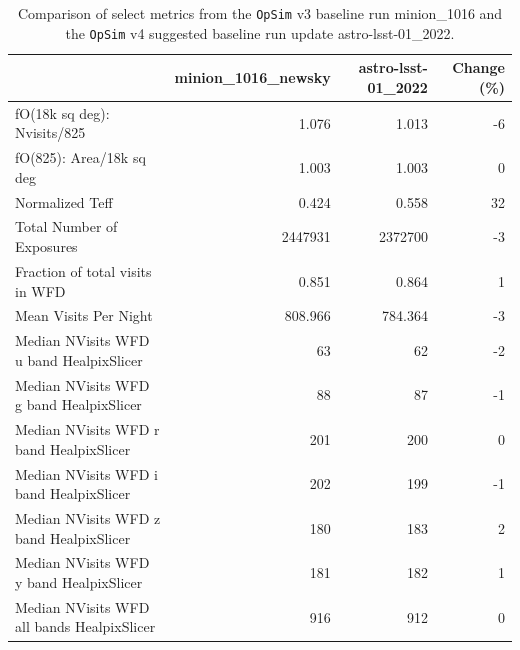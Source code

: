 \documentclass[DM,lsstdraft,authoryear,toc]{lsstdoc}
\newcommand{\opsim}{\texttt{OpSim}\xspace}
\begin{document}

\begin{table}
\caption{Comparison of select metrics from the \opsim v3 baseline run minion\_1016 and the \opsim v4 suggested baseline run update astro-lsst-01\_2022.}
\small
\begin{center}
\begin{tabular}{lrrr}
\toprule
{} &  minion\_1016\_newsky &  astro-lsst-01\_2022 &  Change (\%) \\
\midrule
fO(18k sq deg): Nvisits/825   &               1.076 &               1.013 &         -6 \\
fO(825): Area/18k sq deg     &               1.003 &               1.003 &          0 \\
Normalized Teff                                    &               0.424 &               0.558 &         32 \\
Total Number of Exposures                                &             2447931 &             2372700 &         -3 \\
Fraction of total visits in WFD                      &               0.851 &               0.864 &          1 \\
Mean Visits Per Night                   &             808.966 &             784.364 &         -3 \\
Median NVisits WFD u band HealpixSlicer            &                  63 &                  62 &         -2 \\
Median NVisits WFD g band HealpixSlicer            &                  88 &                  87 &         -1 \\
Median NVisits WFD r band HealpixSlicer            &                 201 &                 200 &          0 \\
Median NVisits WFD i band HealpixSlicer            &                 202 &                 199 &         -1 \\
Median NVisits WFD z band HealpixSlicer            &                 180 &                 183 &          2 \\
Median NVisits WFD y band HealpixSlicer            &                 181 &                 182 &          1 \\
Median NVisits WFD all bands HealpixSlicer         &                 916 &                 912 &          0 \\

\end{tabular}
\end{center}
\end{table}
\end{document}
